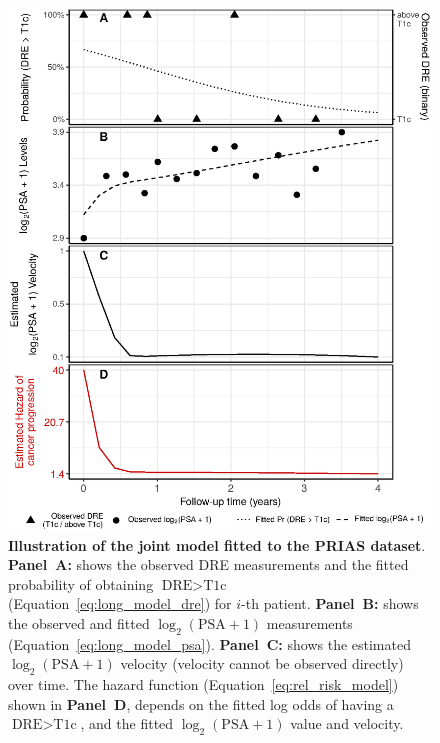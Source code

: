 \begin{figure}[!htb]
\captionsetup{justification=justified}
\centerline{\includegraphics[width=\columnwidth]{images/jmExplanationPlot_1757.eps}}
\caption{\textbf{Illustration of the joint model fitted to the PRIAS dataset}. \textbf{Panel~A:} shows the observed DRE measurements and the fitted probability of obtaining $\mbox{DRE} > \mbox{T1c}$ (Equation~\ref{eq:long_model_dre}) for $i$-th patient. \textbf{Panel~B:} shows the observed and fitted $\log_2(\mbox{PSA} + 1)$ measurements (Equation~\ref{eq:long_model_psa}). \textbf{Panel~C:} shows the estimated $\log_2(\mbox{PSA} + 1)$ velocity (velocity cannot be observed directly) over time. The hazard function (Equation~\ref{eq:rel_risk_model}) shown in \textbf{Panel~D}, depends on the fitted log odds of having a $\mbox{DRE} > \mbox{T1c}$, and the fitted $\log_2(\mbox{PSA} + 1)$ value and velocity.}
\label{fig:jmExplanationPlot_1757}
\end{figure}

